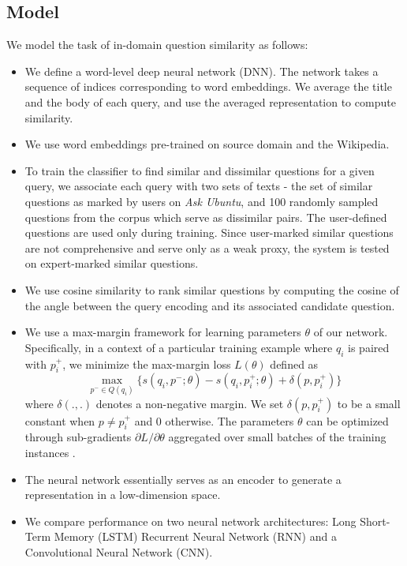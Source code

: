 \documentclass{sigkddExp}
\begin{document}
\subsection{Model}
We model the task of in-domain question similarity as follows:
\begin{itemize}[topsep=0pt,itemsep=-1ex,partopsep=1ex,parsep=1ex]
  \item We define a word-level deep neural network (DNN). The network takes a sequence of indices corresponding to word embeddings. We average the title and the body of each query, and use the averaged representation to compute similarity.
  \item We use word embeddings pre-trained on source domain and the Wikipedia.
  \item To train the classifier to find similar and dissimilar questions for a given query, we associate each query with two sets of texts - the set of similar questions as marked by users on \textit{Ask Ubuntu}, and 100 randomly sampled questions from the corpus which serve as dissimilar pairs. The user-defined questions are used only during training. Since user-marked similar questions are not comprehensive and serve only as a weak proxy, the system is tested on expert-marked similar questions.
  \item We use cosine similarity to rank similar questions by computing the cosine of the angle between the query encoding and its associated candidate question.
  \item We use a max-margin framework for learning parameters $\theta$ of our network. Specifically, in a context of a particular training example where $q_i$ is paired with $p^+_i$, we minimize the max-margin loss $L(\theta)$ defined as\\
  \begin{equation}
  \max_{p^- \in Q(q_i)} \{s(q_i,p^-;\theta) - s(q_i,p^+_i;\theta) + \delta(p, p^+_i)\}
  \end{equation}
where $\delta(.,.)$ denotes a non-negative margin. We set $\delta(p, p^+_i)$ to be a small constant when $p \neq p^+_i$ and 0 otherwise. The parameters $\theta$ can be optimized through sub-gradients ${\partial L}/{\partial \theta}$ aggregated over small batches of the training instances \cite{lei2015semi}.
  \item The neural network essentially serves as an encoder to generate a representation in a low-dimension space.
  \item We compare performance on two neural network architectures: Long Short-Term Memory (LSTM) Recurrent Neural Network (RNN) and a Convolutional Neural Network (CNN).

\end{itemize}
\end{document}
